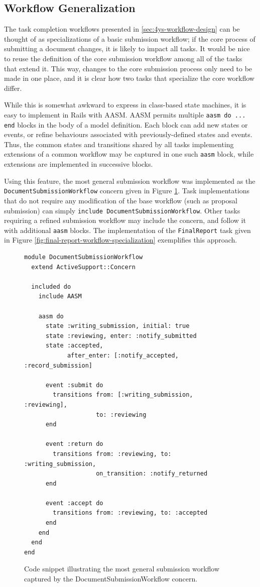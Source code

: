 \subsection{Workflow Generalization}

The task completion workflows presented in \ref{sec:4ys-workflow-design} can be thought of as specializations of a basic submission workflow; if the core process of submitting a document changes, it is likely to impact all tasks. It would be nice to reuse the definition of the core submission workflow among all of the tasks that extend it. This way, changes to the core submission process only need to be made in one place, and it is clear how two tasks that specialize the core workflow differ.

While this is somewhat awkward to express in class-based state machines, it is easy to implement in Rails with AASM. AASM permits multiple \verb!aasm do ... end!
blocks in the body of a model definition. Each block can add new states or events, or refine behaviours associated with previously-defined states and events. Thus, the common states and transitions shared by all tasks implementing extensions of a common workflow may be captured in one such
\verb!aasm! block, while extensions are implemented in successive blocks.

Using this feature, the most general submission workflow was implemented as the \verb!DocumentSubmissionWorkflow! concern given in Figure
\ref{fig:document-submission-concern}. Task implementations that do not require any modification of the base workflow (such as proposal submission) can simply \verb!include DocumentSubmissionWorkflow!. Other tasks requiring a refined submission workflow may include the concern, and follow it with additional \verb!aasm! blocks. The implementation of the \verb!FinalReport! task given in Figure \ref{fig:final-report-workflow-specialization} exemplifies this approach.

\begin{figure}[!ht]
  \begin{lstlisting}
module DocumentSubmissionWorkflow
  extend ActiveSupport::Concern

  included do
    include AASM

    aasm do
      state :writing_submission, initial: true
      state :reviewing, enter: :notify_submitted
      state :accepted,
            after_enter: [:notify_accepted, :record_submission]

      event :submit do
        transitions from: [:writing_submission, :reviewing],
                    to: :reviewing
      end

      event :return do
        transitions from: :reviewing, to: :writing_submission,
                    on_transition: :notify_returned
      end

      event :accept do
        transitions from: :reviewing, to: :accepted
      end
    end
  end
end
  \end{lstlisting}
  \caption{Code snippet illustrating the most general submission workflow captured by the DocumentSubmissionWorkflow concern.}
  \label{fig:document-submission-concern}
\end{figure}

